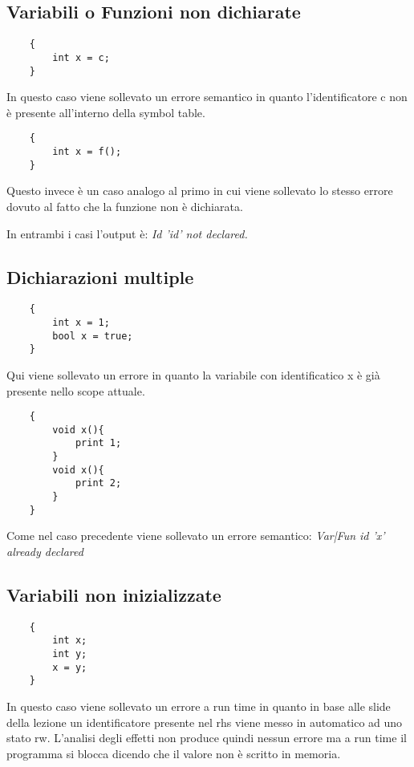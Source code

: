 \documentclass[../../main]{subfiles}
\begin{document}
\subsection{Variabili o Funzioni non dichiarate}

\begin{lstlisting}
    {
        int x = c;
    }
\end{lstlisting}
In questo caso viene sollevato un errore semantico in quanto l'identificatore c
non è presente all'interno della symbol table.
\begin{lstlisting}
    {
        int x = f();
    }
\end{lstlisting}
Questo invece è un caso analogo al primo in cui viene sollevato lo stesso errore
dovuto al fatto che la funzione non è dichiarata.

In entrambi i casi l'output è:
\textit{Id 'id' not declared.}

\subsection{Dichiarazioni multiple}
\begin{lstlisting}
    {
        int x = 1;
        bool x = true;
    }
\end{lstlisting}
Qui viene sollevato un errore in quanto la variabile con identificatico x è già presente
nello scope attuale.

\begin{lstlisting}
    {
        void x(){
            print 1;
        }
        void x(){
            print 2;
        }
    }
\end{lstlisting}
Come nel caso precedente viene sollevato un errore semantico:
\textit{Var|Fun id 'x' already declared}

\subsection{Variabili non inizializzate}

\begin{lstlisting}
    {
        int x;
        int y;
        x = y;
    }
\end{lstlisting}
In questo caso viene sollevato un errore a run time in quanto in base alle slide della lezione
un identificatore presente nel rhs viene messo in automatico ad uno stato rw. L'analisi degli effetti 
non produce quindi nessun errore ma a run time il programma si blocca dicendo che il valore non è scritto in memoria.
\end{document}
